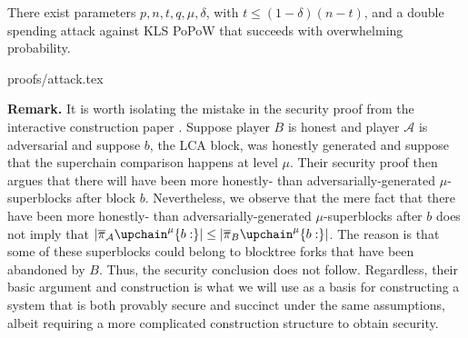 \begin{theorem}
There exist parameters $p, n, t, q,  \mu, \delta$, with $t\leq (1-\delta)(n-t)$,
and a double spending attack against KLS PoPoW that succeeds with overwhelming
probability.
\end{theorem}
{proofs/attack.tex}

\textbf{Remark.} It is worth isolating the mistake in the security proof from
the interactive construction paper \cite{KLS}. Suppose player $B$ is honest and
player $\mathcal{A}$ is adversarial and suppose $b$, the LCA block, was honestly
generated and suppose that the superchain comparison happens at level $\mu$.
Their security proof then argues that there will have been more honestly- than
adversarially-generated $\mu$-superblocks after block $b$. Nevertheless, we
observe that the mere fact that there have been more honestly- than
adversarially-generated $\mu$-superblocks after $b$ does not imply that
$|\overline\pi_\mathcal{A}\upchain^\mu\{b:\}| \leq |\overline\pi_B\upchain^\mu\{b:\}|$. The
reason is that some of these superblocks could belong to blocktree forks that
have been abandoned by $B$. Thus, the security conclusion does not follow.
Regardless, their basic argument and construction is what we will use as a basis
for constructing a system that is both provably secure and succinct under the
same assumptions, albeit requiring a more complicated construction structure to
obtain security.
